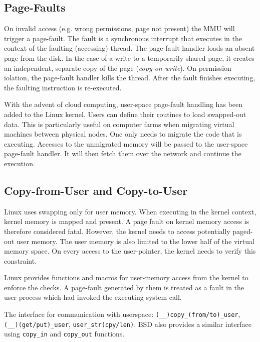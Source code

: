 \subsection{Page-Faults}
\label{subsec:pagefaults}
On invalid access (e.g. wrong permissions, page not present) the MMU will
trigger a page-fault. The fault is a synchronous interrupt that executes in the
context of the faulting (accessing) thread. The page-fault handler loads an
absent page from the disk. In the case of a write to a temporarily shared page,
it creates an independent, separate copy of the page (\emph{copy-on-write}). On
permission iolation, the page-fault handler kills the thread. After the fault
finishes executing, the faulting instruction is re-executed. 

With the advent of cloud computing, user-space page-fault handling has been added 
to the Linux kernel. Users can define their routines to load swapped-out data.
This is particularly useful on computer farms when migrating virtual machines
between physical nodes. One only needs to migrate the code that is executing.
Accesses to the unmigrated memory will be passed to the user-space page-fault
handler. It will then fetch them over the network and continue the execution.

\subsection{Copy-from-User and Copy-to-User}
\label{subsec:copy}
Linux uses swapping only for user memory. When executing in the kernel context,
kernel memory is mapped and present. A page fault on kernel memory access is
therefore considered fatal. However, the kernel needs to access potentially
paged-out user memory. The user memory is also limited to the lower half of the
virtual memory space. On every access to the user-pointer, the kernel needs to
verify this constraint.

Linux provides functions and macros for user-memory access from the kernel to 
enforce the checks. A page-fault generated by them is treated as a fault in the
user process which had invoked the executing system call.

The interface for communication with userspace: \texttt{(\_\_)copy\_(from/to)\_user},
\texttt{(\_\_)(get/put)\_user}, \texttt{user\_str(cpy/len)}.
BSD also provides a similar interface using \texttt{copy\_in} and 
\texttt{copy\_out} functions.

